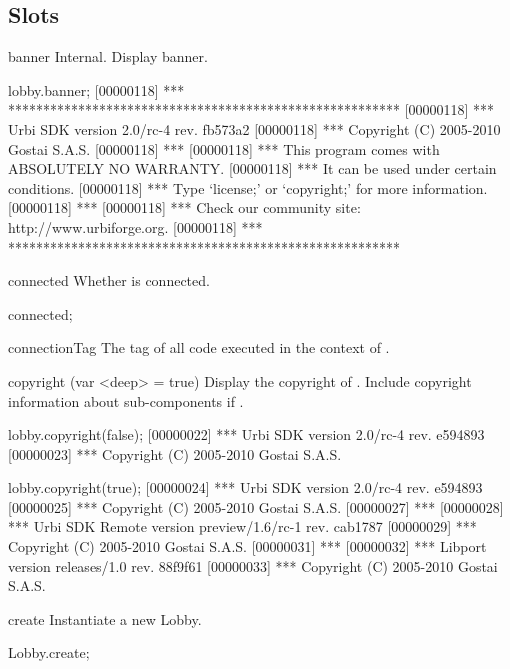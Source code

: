 \subsection{Slots}
\begin{urbiscriptapi}
\item[banner] Internal.  Display \usdk banner.
\begin{urbiscript}
lobby.banner;
[00000118] *** ********************************************************
[00000118] *** Urbi SDK version 2.0/rc-4 rev. fb573a2
[00000118] *** Copyright (C) 2005-2010 Gostai S.A.S.
[00000118] ***
[00000118] *** This program comes with ABSOLUTELY NO WARRANTY.
[00000118] *** It can be used under certain conditions.
[00000118] *** Type `license;' or `copyright;' for more information.
[00000118] ***
[00000118] *** Check our community site: http://www.urbiforge.org.
[00000118] *** ********************************************************
\end{urbiscript}

\item[connected]
  Whether \this is connected.
\begin{urbiassert}
connected;
\end{urbiassert}

\item[connectionTag]
  The tag of all code executed in the context of \this.

\item[copyright](var <deep> = true)%
  Display the copyright of \usdk.  Include copyright information
  about sub-components if .
\begin{urbiscript}
lobby.copyright(false);
[00000022] *** Urbi SDK version 2.0/rc-4 rev. e594893
[00000023] *** Copyright (C) 2005-2010 Gostai S.A.S.

lobby.copyright(true);
[00000024] *** Urbi SDK version 2.0/rc-4 rev. e594893
[00000025] *** Copyright (C) 2005-2010 Gostai S.A.S.
[00000027] ***
[00000028] *** Urbi SDK Remote version preview/1.6/rc-1 rev. cab1787
[00000029] *** Copyright (C) 2005-2010 Gostai S.A.S.
[00000031] ***
[00000032] *** Libport version releases/1.0 rev. 88f9f61
[00000033] *** Copyright (C) 2005-2010 Gostai S.A.S.
\end{urbiscript}

\item[create]
  Instantiate a new Lobby.
\begin{urbiassert}
Lobby.create;
\end{urbiassert}


\end{urbiscriptapi}
